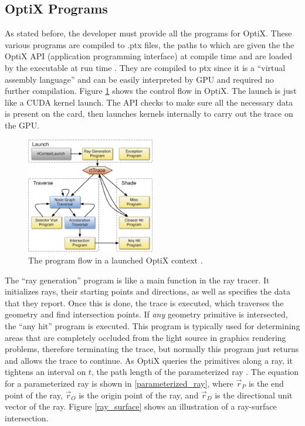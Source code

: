 \subsection{OptiX Programs}

As stated before, the developer must provide all the programs for OptiX.  These various programs are compiled to .ptx files, the paths to which are given the the OptiX API (application programming interface) at compile time and are loaded by the executable at run time \cite{optix}.  They are compiled to ptx since it is a ``virtual assembly language'' and can be easily interpreted by GPU and required no further compilation.  Figure \ref{optix_flow} shows the control flow in OptiX.  The launch is just like a CUDA kernel launch.  The API checks to make sure all the necessary data is present on the card, then launches kernels internally to carry out the trace on the GPU.

\begin{figure}[h!] 
  \centering
    \includegraphics[width=0.5\textwidth]{graphics/optix_flow.eps}
     \caption[The program flow in a launched OptiX context.]{The program flow in a launched OptiX context \cite{optix_paper}. \label{optix_flow}}
\end{figure}

The ``ray generation'' program is like a main function in the ray tracer. It initializes rays, their starting points and directions, as well as specifies the data that they report.  Once this is done, the trace is executed, which traverses the geometry and find intersection points.  If \emph{any} geometry primitive is intersected, the ``any hit'' program is executed.  This program is typically used for determining areas that are completely occluded from the light source in graphics rendering problems, therefore terminating the trace, but normally this program just returns and allows the trace to continue.  As OptiX queries the primitives along a ray, it tightens an interval on $t$, the path length of the parameterized ray \cite{optix}.  The equation for a parameterized ray is shown in \eqref{parameterized_ray}, where $\vec{r}_P$ is the end point of the ray, $\vec{r}_O$ is the origin point of the ray, and $\vec{r}_D$ is the directional unit vector of the ray.  Figure \ref{ray_surface} shows an illustration of a ray-surface intersection.

